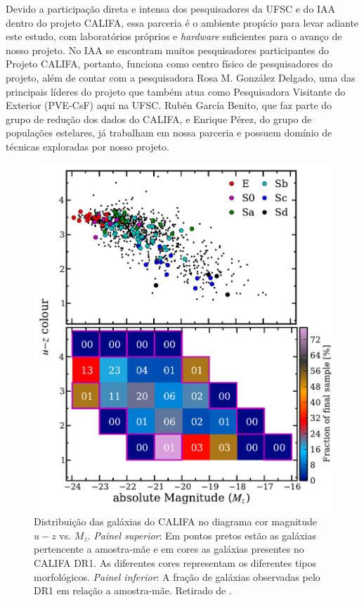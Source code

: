 \documentclass[a4paper,12pt]{article}
\begin{document}
Devido a participação direta e intensa dos pesquisadores da UFSC e do IAA dentro do projeto CALIFA, essa parceria é o ambiente propício para levar
adiante este estudo, com laboratórios próprios e {\em hardware} suficientes para o avanço de nosso projeto. No IAA se encontram muitos pesquisadores
participantes do Projeto CALIFA, portanto, funciona como centro físico de pesquisadores do projeto, além de contar com a pesquisadora Rosa M. González
Delgado, uma das principais líderes do projeto que também atua como Pesquisadora Visitante do Exterior (PVE-CsF) aqui na UFSC. Rubén García Benito,
que faz parte do grupo de redução dos dados do CALIFA, e Enrique Pérez, do grupo de populações estelares, já trabalham em nossa parceria e possuem
domínio de técnicas exploradas por nosso projeto.

\begin{figure}
	\begin{center}
    \includegraphics[height=0.5\textwidth]{figuras/figHusemann2013Fig2.pdf}
    \caption[Diagrama cor-magnitude para as galáxias do CALIFA.]
    {Distribui\c{c}\~ao das galáxias do CALIFA no diagrama cor magnitude $u-z$ vs. $M_z$. {\em Painel superior}: Em pontos pretos est\~ao as galáxias
    pertencente a amostra-m\~ae e em cores as galáxias presentes no CALIFA DR1. As diferentes cores representam os diferentes tipos morfológicos.
    {\em Painel inferior}: A fra\c{c}\~ao de galáxias observadas pelo DR1 em rela\c{c}\~ao a amostra-m\~ae. Retirado de \citet{Husemann2013}.}
    \label{fig:cm-uzMz}
    \end{center}
\end{figure}
\end{document}
